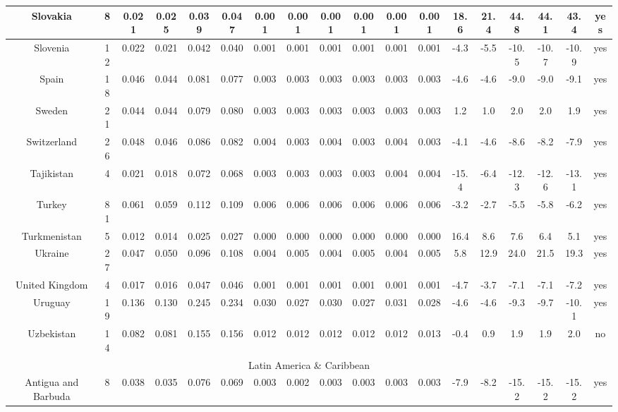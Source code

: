\documentclass[10pt]{article}
\begin{document}
\begin{center}
\begin{tabular}{|c|c|c|c|c|c|c|c|c|c|c|c|c|c|c|c|c|c|}
\hline
Slovakia & 8 & 0.021 & 0.025 & 0.039 & 0.047 & 0.001 & 0.001 & 0.001 & 0.001 & 0.001 & 0.001 & 18.6 & 21.4 & 44.8 & 44.1 & 43.4 & yes \\
\hline
Slovenia & 12 & 0.022 & 0.021 & 0.042 & 0.040 & 0.001 & 0.001 & 0.001 & 0.001 & 0.001 & 0.001 & -4.3 & -5.5 & -10.5 & -10.7 & -10.9 & yes \\
\hline
Spain & 18 & 0.046 & 0.044 & 0.081 & 0.077 & 0.003 & 0.003 & 0.003 & 0.003 & 0.003 & 0.003 & -4.6 & -4.6 & -9.0 & -9.0 & -9.1 & yes \\
\hline
Sweden & 21 & 0.044 & 0.044 & 0.079 & 0.080 & 0.003 & 0.003 & 0.003 & 0.003 & 0.003 & 0.003 & 1.2 & 1.0 & 2.0 & 2.0 & 1.9 & yes \\
\hline
Switzerland & 26 & 0.048 & 0.046 & 0.086 & 0.082 & 0.004 & 0.003 & 0.004 & 0.003 & 0.004 & 0.003 & -4.1 & -4.6 & -8.6 & -8.2 & -7.9 & yes \\
\hline
Tajikistan & 4 & 0.021 & 0.018 & 0.072 & 0.068 & 0.003 & 0.003 & 0.003 & 0.003 & 0.004 & 0.004 & -15.4 & -6.4 & -12.3 & -12.6 & -13.1 & yes \\
\hline
Turkey & 81 & 0.061 & 0.059 & 0.112 & 0.109 & 0.006 & 0.006 & 0.006 & 0.006 & 0.006 & 0.006 & -3.2 & -2.7 & -5.5 & -5.8 & -6.2 & yes \\
\hline
Turkmenistan & 5 & 0.012 & 0.014 & 0.025 & 0.027 & 0.000 & 0.000 & 0.000 & 0.000 & 0.000 & 0.000 & 16.4 & 8.6 & 7.6 & 6.4 & 5.1 & yes \\
\hline
Ukraine & 27 & 0.047 & 0.050 & 0.096 & 0.108 & 0.004 & 0.005 & 0.004 & 0.005 & 0.004 & 0.005 & 5.8 & 12.9 & 24.0 & 21.5 & 19.3 & yes \\
\hline
United Kingdom & 4 & 0.017 & 0.016 & 0.047 & 0.046 & 0.001 & 0.001 & 0.001 & 0.001 & 0.001 & 0.001 & -4.7 & -3.7 & -7.1 & -7.1 & -7.2 & yes \\
\hline
Uruguay & 19 & 0.136 & 0.130 & 0.245 & 0.234 & 0.030 & 0.027 & 0.030 & 0.027 & 0.031 & 0.028 & -4.6 & -4.6 & -9.3 & -9.7 & -10.1 & yes \\
\hline
Uzbekistan & 14 & 0.082 & 0.081 & 0.155 & 0.156 & 0.012 & 0.012 & 0.012 & 0.012 & 0.012 & 0.013 & -0.4 & 0.9 & 1.9 & 1.9 & 2.0 & no \\
\hline
\multicolumn{18}{|c|}{Latin America \& Caribbean} \\
\hline
Antigua and Barbuda & 8 & 0.038 & 0.035 & 0.076 & 0.069 & 0.003 & 0.002 & 0.003 & 0.003 & 0.003 & 0.003 & -7.9 & -8.2 & -15.2 & -15.2 & -15.2 & yes \\

\end{tabular}
\end{center}
\end{document}
